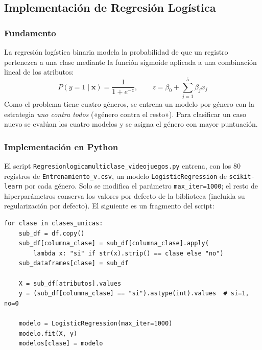 \documentclass[]{article}
\begin{document}
\subsection{Implementación de Regresión Logística}

\subsubsection{Fundamento}

La regresión logística binaria modela la probabilidad de que un registro pertenezca a una clase mediante la función sigmoide aplicada a una combinación lineal de los atributos:
\begin{equation}
P(y=1\mid\mathbf{x})=\frac{1}{1+e^{-z}},\qquad z=\beta_0+\sum_{j=1}^{5}\beta_j x_j
\end{equation}
Como el problema tiene cuatro géneros, se entrena un modelo por género con la estrategia \emph{uno contra todos} («género contra el resto»). Para clasificar un caso nuevo se evalúan los cuatro modelos y se asigna el género con mayor puntuación.

\subsubsection{Implementación en Python}

El script \texttt{Regresionlogicamulticlase\_videojuegos.py} entrena, con los 80 registros de \texttt{Entrenamiento\_v.csv}, un modelo \texttt{LogisticRegression} de \texttt{scikit-learn} por cada género. Solo se modifica el parámetro \texttt{max\_iter=1000}; el resto de hiperparámetros conserva los valores por defecto de la biblioteca (incluida su regularización por defecto). El siguiente es un fragmento del script:

\begin{lstlisting}
for clase in clases_unicas:
    sub_df = df.copy()
    sub_df[columna_clase] = sub_df[columna_clase].apply(
        lambda x: "si" if str(x).strip() == clase else "no")
    sub_dataframes[clase] = sub_df

    X = sub_df[atributos].values
    y = (sub_df[columna_clase] == "si").astype(int).values  # si=1, no=0

    modelo = LogisticRegression(max_iter=1000)
    modelo.fit(X, y)
    modelos[clase] = modelo
\end{lstlisting}
\end{document}
